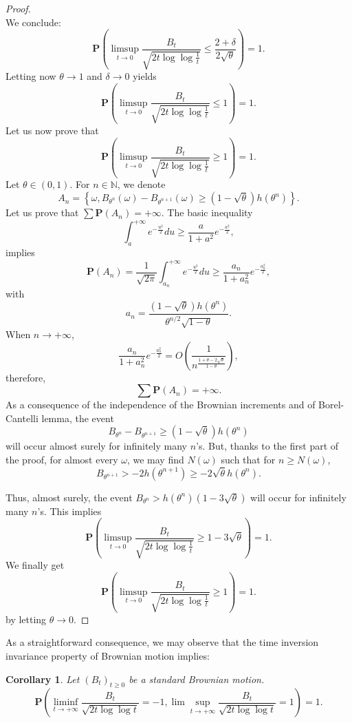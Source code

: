 \documentclass[twoside, 12pt]{book}
\numberwithin{equation}{chapter}
\newtheorem{corollary}[theorem]{Corollary}
\def\bP{{\mathbf P}}
\def\ge{\geqslant}
\def\le{\leqslant}
\begin{document}
\begin{proof}
$$		$$
		We conclude:
		$$
		\bP \left( \limsup_{t \rightarrow 0} \frac{B_{t}}{\sqrt{2t\log  \log  \frac{1}{t}}} \le \frac{2+\delta}{2\sqrt{\theta}}\right)=1.  
		$$
		Letting now $\theta \rightarrow 1$ and $\delta \rightarrow 0$ yields
		$$
		\bP \left( \limsup_{t \rightarrow 0} \frac{B_{t}}{\sqrt{2t \log  \log  \frac{1}{t}}} \le 1\right)=1.  
		$$
		Let us now prove that
		$$
		\bP \left( \limsup_{t \rightarrow 0} \frac{B_{t}}{\sqrt{2t\log  \log  \frac{1}{t}}} \ge 1 \right)=1.  
		$$
		Let $\theta \in (0,1)$. For $n \in \mathbb{N}$, we denote
		$$
		A_n=\left\{ \omega, B_{\theta^n}(\omega)-B_{\theta^{n+1}}(\omega) \ge (1-\sqrt{\theta})h(\theta^n)\right\}.  
		$$
		Let us prove that $\sum \bP  (A_n)=+\infty$.  The basic inequality
		$$
		\int_{a}^{+\infty} e^{-\frac{u^2}{2}}du \ge \frac{a}{1+a^2}e^{-\frac{a^2}{2}},  
		$$
		implies
		$$
		\bP  (A_n)=\frac{1}{\sqrt{2\pi}}\int_{a_n}^{+\infty}e^{-\frac{u^2}{2}}du  \ge \frac{a_n}{1+a_n^2}e^{-\frac{a_n^2}{2}},  
		$$
		with
		$$
		a_n=\frac{(1-\sqrt{\theta})h(\theta^n)}{\theta^{n/2} \sqrt{1-\theta}}.  
		$$
		When $n \to +\infty$,
		$$
		\frac{a_n}{1+a_n^2} e^{-\frac{a_n^2}{2}}=O\left(\frac{1}{n^{\frac{1+\theta-2\sqrt{\theta}}{1-\theta}}}\right),  
		$$
		therefore,
		$$
		\sum \bP  (A_n)=+\infty.  
		$$
		As a consequence of the independence of the Brownian increments and of Borel-Cantelli lemma, the event
		$$
		B_{\theta^n}-B_{\theta^{n+1}} \ge (1-\sqrt{\theta})h(\theta^n)  
		$$
		will occur almost surely for infinitely many $n$'s. But, thanks to the first part of the proof, for almost every $\omega$, we may find $N(\omega)$ such that for $n \ge N(\omega)$,
		$$
		B_{\theta^{n+1}}>-2h(\theta^{n+1})\ge-2\sqrt{\theta} h(\theta^n).  
		$$
		
		Thus, almost surely, the event $B_{\theta^n} >h(\theta^n)(1-3\sqrt{\theta})$ will occur for infinitely many $n$'s. This implies
		$$
		\bP \left( \limsup_{t \rightarrow 0} \frac{B_{t}}{\sqrt{2t \log  \log  \frac{1}{t}}} \ge 1-3\sqrt{\theta} \right)=1.  
		$$
		We finally get
		\[
		\bP \left( \limsup_{t \rightarrow 0} \frac{B_{t}}{\sqrt{2t \log  \log  \frac{1}{t}}} \ge 1 \right)=1.  
		\]
		by letting $\theta \to 0$. 
	\end{proof}
	As a straightforward consequence, we may observe that the time inversion invariance property of Brownian motion implies: 
	\begin{corollary}
		Let $(B_t)_{t\ge 0}$ be a standard Brownian motion.
		\[ 
		\bP \left( \liminf_{t \rightarrow +\infty} \frac{B_{t}}{\sqrt{2t \log  \log  t}} =-1,\lim  \sup_{t \rightarrow +\infty} \frac{B_{t}}{\sqrt{2t \log  \log  t}} =1\right)=1.
		\]
	\end{corollary} 
	
\end{document}
